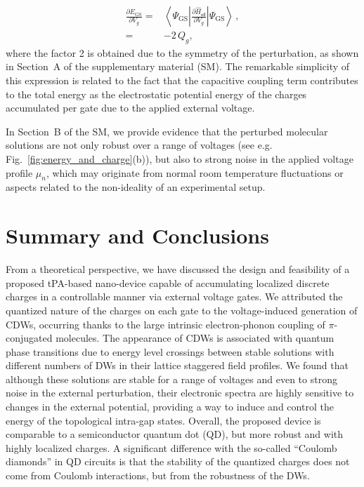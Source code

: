 \documentclass[10pt,a4paper]{article}
\begin{document}
%
\begin{align}
\frac{\partial E_{\mathrm{GS}}}{\partial V_{g}} = & \left\langle \Psi_{\mathrm{GS}} \left| \frac{\partial \hat{H}_{\textbf{el}}}{\partial V_{g}} \right| \Psi_{\mathrm{GS}} \right\rangle \, , \nonumber\\
= & -2 \, Q_{g},\label{eq:localized_charge}
\end{align}
%
where the factor 2 is obtained due to the symmetry of the perturbation, as shown in Section~A of the supplementary material (SM). The remarkable simplicity of this expression is related to the fact that the capacitive coupling term contributes to the total energy as the electrostatic potential energy of the charges accumulated per gate due to the applied external voltage. 

In Section~B of the SM, we provide evidence that the perturbed molecular solutions are not only robust over a range of voltages (see e.g. Fig.~\ref{fig:energy_and_charge}(b)), but also to strong noise in the applied voltage profile $\mu_{n}$, which may originate from normal room temperature fluctuations or aspects related to the non-ideality of an experimental setup.

\section{Summary and Conclusions}\label{sec:conclusions}

From a theoretical perspective, we have discussed the design and feasibility of a proposed tPA-based nano-device capable of accumulating localized discrete charges in a controllable manner via external voltage gates. We attributed the quantized nature of the charges on each gate to the voltage-induced generation of CDWs, occurring thanks to the large intrinsic electron-phonon coupling of $\pi$-conjugated molecules. The appearance of CDWs is associated with quantum phase transitions due to energy level crossings between stable solutions with different numbers of DWs in their lattice staggered field profiles. We found that although these solutions are stable for a range of voltages and even to strong noise in the external perturbation, their electronic spectra are highly sensitive to changes in the external potential, providing a way to induce and control the energy of the topological intra-gap states. Overall, the proposed device is comparable to a semiconductor quantum dot (QD), but more robust and with highly localized charges. A significant difference with the so-called ``Coulomb diamonds'' in QD circuits is that the stability of the quantized charges does not come from Coulomb interactions, but from the robustness of the DWs.
\end{document}
